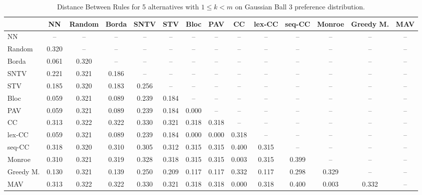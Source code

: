 
\begin{table*}
\centering
\begin{tabular}{lccccccccccccc}
\toprule
 & NN & Random & Borda & SNTV & STV & Bloc & PAV & CC & lex-CC & seq-CC & Monroe & Greedy M. & MAV \\
\midrule
NN & -- & -- & -- & -- & -- & -- & -- & -- & -- & -- & -- & -- & -- \\
Random & 0.320 & -- & -- & -- & -- & -- & -- & -- & -- & -- & -- & -- & -- \\
Borda & 0.061 & 0.320 & -- & -- & -- & -- & -- & -- & -- & -- & -- & -- & -- \\
SNTV & 0.221 & 0.321 & 0.186 & -- & -- & -- & -- & -- & -- & -- & -- & -- & -- \\
STV & 0.185 & 0.320 & 0.183 & 0.256 & -- & -- & -- & -- & -- & -- & -- & -- & -- \\
Bloc & 0.059 & 0.321 & 0.089 & 0.239 & 0.184 & -- & -- & -- & -- & -- & -- & -- & -- \\
PAV & 0.059 & 0.321 & 0.089 & 0.239 & 0.184 & 0.000 & -- & -- & -- & -- & -- & -- & -- \\
CC & 0.313 & 0.322 & 0.322 & 0.330 & 0.321 & 0.318 & 0.318 & -- & -- & -- & -- & -- & -- \\
lex-CC & 0.059 & 0.321 & 0.089 & 0.239 & 0.184 & 0.000 & 0.000 & 0.318 & -- & -- & -- & -- & -- \\
seq-CC & 0.318 & 0.320 & 0.310 & 0.305 & 0.312 & 0.315 & 0.315 & 0.400 & 0.315 & -- & -- & -- & -- \\
Monroe & 0.310 & 0.321 & 0.319 & 0.328 & 0.318 & 0.315 & 0.315 & 0.003 & 0.315 & 0.399 & -- & -- & -- \\
Greedy M. & 0.130 & 0.321 & 0.139 & 0.250 & 0.209 & 0.117 & 0.117 & 0.332 & 0.117 & 0.298 & 0.329 & -- & -- \\
MAV & 0.313 & 0.322 & 0.322 & 0.330 & 0.321 & 0.318 & 0.318 & 0.000 & 0.318 & 0.400 & 0.003 & 0.332 & -- \\
\bottomrule
\end{tabular}

\caption{Distance Between Rules for 5 alternatives with $1 \leq k < m$ on Gaussian Ball 3 preference distribution.}
\end{table*}
